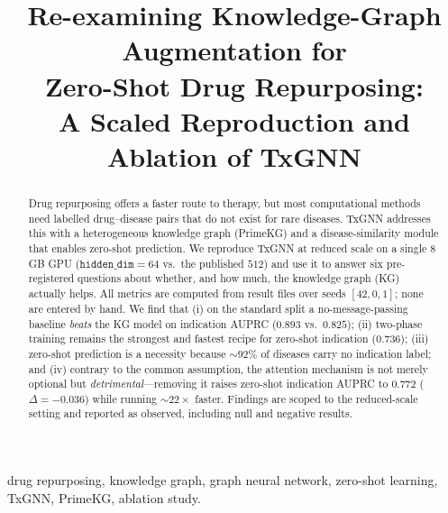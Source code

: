 \documentclass[conference]{IEEEtran}
\begin{document}
\title{Re-examining Knowledge-Graph Augmentation for\\
Zero-Shot Drug Repurposing:\\
A Scaled Reproduction and Ablation of TxGNN}

\author{
}

\maketitle

\begin{abstract}
Drug repurposing offers a faster route to therapy, but most computational
methods need labelled drug--disease pairs that do not exist for rare diseases.
TxGNN addresses this with a heterogeneous knowledge graph (PrimeKG) and a
disease-similarity module that enables zero-shot prediction. We reproduce TxGNN
at reduced scale on a single 8\,GB GPU ($\texttt{hidden\_dim}=64$ vs.\ the
published $512$) and use it to answer six pre-registered questions about whether,
and how much, the knowledge graph (KG) actually helps. All metrics are computed
from result files over seeds $[42,0,1]$; none are entered by hand. We find that
(i) on the standard split a no-message-passing baseline \emph{beats} the KG model
on indication AUPRC ($0.893$ vs.\ $0.825$); (ii) two-phase training remains the
strongest and fastest recipe for zero-shot indication ($0.736$); (iii) zero-shot
prediction is a necessity because ${\sim}92\%$ of diseases carry no indication
label; and (iv) contrary to the common assumption, the attention mechanism is
not merely optional but \emph{detrimental}---removing it raises zero-shot
indication AUPRC to $0.772$ ($\Delta=-0.036$) while running ${\sim}22\times$
faster. Findings are scoped to the reduced-scale setting and reported as
observed, including null and negative results.
\end{abstract}

\begin{IEEEkeywords}
drug repurposing, knowledge graph, graph neural network, zero-shot learning,
TxGNN, PrimeKG, ablation study.
\end{IEEEkeywords}

\end{document}
